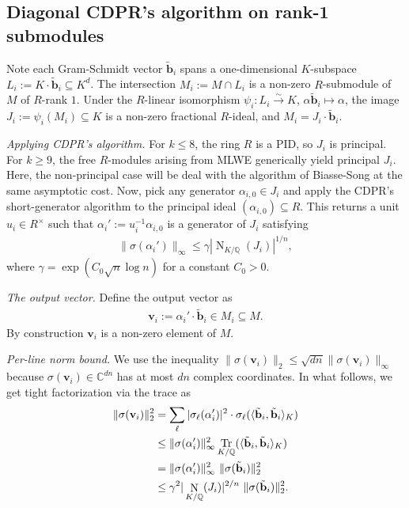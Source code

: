 \documentclass[11pt,a4paper]{article}
\theoremstyle{plain}
\theoremstyle{definition}
\theoremstyle{remark}
\DeclareMathOperator{\Tr}{Tr}
\DeclareMathOperator{\Nm}{N}
\newcommand{\Q}{\mathbb{Q}}
\newcommand{\C}{\mathbb{C}}
\begin{document}
\subsection{Diagonal CDPR's algorithm on rank-1 submodules}

Note each Gram-Schmidt vector $\tilde{\mathbf{b}}_i$ spans a one-dimensional $K$-subspace $L_i:= K\cdot\tilde{\mathbf{b}}_i \subseteq K^d$. The intersection $M_i:= M\cap L_i$ is a non-zero $R$-submodule of $M$ of $R$-rank $1$. Under the $R$-linear isomorphism $\psi_i: L_i\xrightarrow{\sim} K$, $\alpha\tilde{\mathbf{b}}_i\mapsto\alpha$, the image $J_i:= \psi_i(M_i)\subseteq K$ is a non-zero fractional $R$-ideal, and $M_i=J_i\cdot\tilde{\mathbf{b}}_i$.

\bigskip
\noindent\textit{Applying CDPR's algorithm.} For $k\le 8$, the ring $R$ is a PID, so $J_i$ is principal. For $k\ge 9$, the free $R$-modules arising from MLWE generically yield principal $J_i$. Here, the non-principal case will be deal with the algorithm of Biasse-Song \cite{BiasseSong16} at the same asymptotic cost. Now, pick any generator $\alpha_{i,0}\in J_i$ and apply the CDPR's short-generator algorithm \cite{CDPR16,CDW17} to the principal ideal $(\alpha_{i,0})\subseteq R$. This returns a unit $u_i\in R^\times$ such that $\alpha_i':= u_i^{-1}\alpha_{i,0}$ is a generator of $J_i$ satisfying
\begin{align}
  \|\sigma(\alpha_i')\|_\infty \le \gamma
  |\Nm_{K/\Q}(J_i)|^{1/n},
  \label{E:cdprbound}
\end{align}
where $\gamma=\exp(C_0\sqrt n\log n)$ for a constant $C_0>0$. 

\bigskip
\noindent\textit{The output vector.} Define the output vector as 
\begin{align}
  \mathbf{v}_i:= \alpha_i'\cdot\tilde{\mathbf{b}}_i
  \in M_i \subseteq M.
  \label{E:videf}
\end{align}
By construction $\mathbf{v}_i$ is a non-zero element of $M$.

\bigskip
\noindent\textit{Per-line norm bound.} We use the inequality $\|\sigma(\mathbf{v}_i)\|_2\le\sqrt{dn}\|\sigma(\mathbf{v}_i)\|_\infty$ because $\sigma(\mathbf{v}_i)\in\C^{dn}$ has at most $dn$ complex coordinates. In what follows, we get tight factorization via the trace as 
\begin{align}
  \|\sigma(\mathbf{v}_i)\|_2^2
  &= \sum_\ell|\sigma_\ell(\alpha_i')|^2\cdot     \sigma_\ell(\langle\tilde{\mathbf{b}}_i,\tilde{\mathbf{b}}_i\rangle_K)
  \notag\\
  &\le \|\sigma(\alpha_i')\|_\infty^2 \Tr_{K/\Q}(\langle\tilde{\mathbf{b}}_i, \tilde{\mathbf{b}}_i\rangle_K)
  \notag\\
  &= \|\sigma(\alpha_i')\|_\infty^2\ 
     \|\sigma(\tilde{\mathbf{b}}_i)\|_2^2
  \notag\\
  &\le \gamma^2|\Nm_{K/\Q}(J_i)|^{2/n} \ 
     \|\sigma(\tilde{\mathbf{b}}_i)\|_2^2.
  \label{E:viprel}
\end{align}
\end{document}
